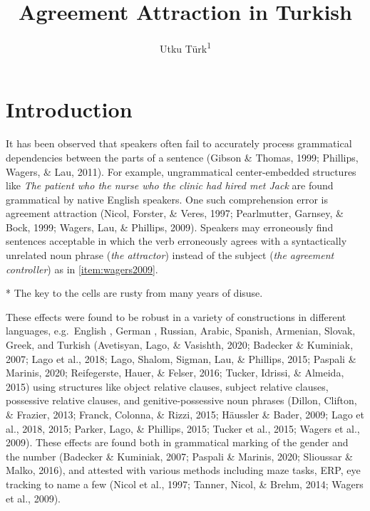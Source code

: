 \documentclass[
  english,
  doc,floatsintext]{apa6}
\title{Agreement Attraction in Turkish}
\author{Utku Türk\textsuperscript{1}}
\date{}
\affiliation{\vspace{0.5cm}\textsuperscript{1} Boğaziçi University University, Istanbul, Turkey}
\begin{document}
\maketitle

\hypertarget{introduction}{%
\section{Introduction}\label{introduction}}

It has been observed that speakers often fail to accurately process grammatical dependencies between the parts of a sentence (Gibson \& Thomas, 1999; Phillips, Wagers, \& Lau, 2011).
For example, ungrammatical center-embedded structures like \emph{The patient who the nurse who the clinic had hired met Jack} are found grammatical by native English speakers.
One such comprehension error is agreement attraction (Nicol, Forster, \& Veres, 1997; Pearlmutter, Garnsey, \& Bock, 1999; Wagers, Lau, \& Phillips, 2009).
Speakers may erroneously find sentences acceptable in which the verb erroneously agrees with a syntactically unrelated noun phrase (\emph{the attractor}) instead of the subject (\emph{the agreement controller}) as in \ref{item:wagers2009}.

\begin{exe}
\ex \label{item:wagers2009} * The key to the cells are rusty from many years of disuse. 
\end{exe}

These effects were found to be robust in a variety of constructions in different languages, e.g.~English , German , Russian, Arabic, Spanish, Armenian, Slovak, Greek, and Turkish (Avetisyan, Lago, \& Vasishth, 2020; Badecker \& Kuminiak, 2007; Lago et al., 2018; Lago, Shalom, Sigman, Lau, \& Phillips, 2015; Paspali \& Marinis, 2020; Reifegerste, Hauer, \& Felser, 2016; Tucker, Idrissi, \& Almeida, 2015) using structures like object relative clauses, subject relative clauses, possessive relative clauses, and genitive-possessive noun phrases (Dillon, Clifton, \& Frazier, 2013; Franck, Colonna, \& Rizzi, 2015; Häussler \& Bader, 2009; Lago et al., 2018, 2015; Parker, Lago, \& Phillips, 2015; Tucker et al., 2015; Wagers et al., 2009). These effects are found both in grammatical marking of the gender and the number (Badecker \& Kuminiak, 2007; Paspali \& Marinis, 2020; Slioussar \& Malko, 2016), and attested with various methods including maze tasks, ERP, eye tracking to name a few (Nicol et al., 1997; Tanner, Nicol, \& Brehm, 2014; Wagers et al., 2009).
\end{document}
